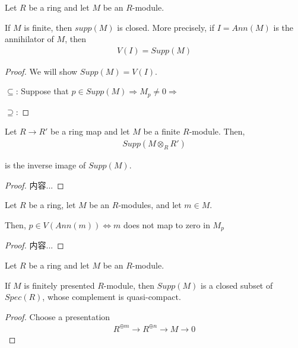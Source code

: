 \documentclass[Total.tex]{subfiles}
\begin{document}
			\begin{lemma}
				Let $R$ be a ring and let $M$ be an $R$-module.
				
				If $M$ is finite, then $supp(M)$ is closed. More precisely, if $I=Ann(M)$ is the annihilator of $M$, then
				\begin{gather*}
					V(I)=Supp(M)
				\end{gather*}
			\end{lemma}
			\begin{proof}
				We will show $Supp(M)=V(I)$.
				
				$\subseteq$: Suppose that $p\in Supp(M)\Rightarrow M_p\not=0\Rightarrow$
				
				$\supseteq$:
			\end{proof}
			
			\begin{lemma}
				Let $R\rightarrow R'$ be a ring map and let $M$ be a finite $R$-module. Then,
				\begin{gather*}
					Supp(M\otimes_R R')
				\end{gather*}
				
				is the inverse image of $Supp(M)$.
			\end{lemma}
			\begin{proof}
				内容...
			\end{proof}
			
			\begin{lemma}
				Let $R$ be a ring, let $M$ be an $R$-modules, and let $m\in M$.
				
				Then, $p\in V(Ann(m))\Leftrightarrow m$ does not map to zero in $M_p$
			\end{lemma}
			\begin{proof}
				内容...
			\end{proof}
			
			\begin{lemma}
				Let $R$ be a ring and let $M$ be an $R$-module.
				
				If $M$ is finitely presented $R$-module, then $Supp(M)$ is a closed subset of $Spec(R)$, whose complement is quasi-compact.
			\end{lemma}
			\begin{proof}
				Choose a presentation
				\begin{gather*}
					R^{\oplus m}\rightarrow R^{\oplus n}\rightarrow M\rightarrow 0
				\end{gather*}
				
				
			\end{proof}
			
\end{document}
